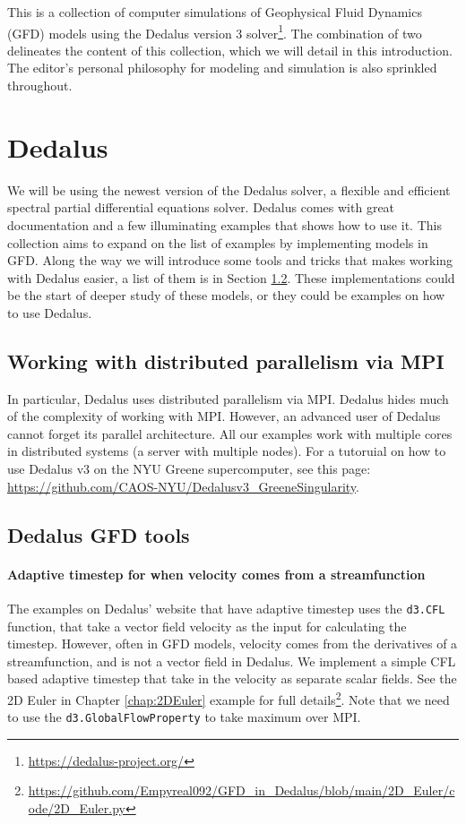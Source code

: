 This is a collection of computer simulations of Geophysical Fluid Dynamics (GFD) models using the Dedalus version 3 solver\footnote{\url{https://dedalus-project.org/}}. The combination of two delineates the content of this collection, which we will detail in this introduction. The editor's personal philosophy for modeling and simulation is also sprinkled throughout. 

\section{Dedalus}
We will be using the newest version of the Dedalus solver, a flexible and efficient spectral partial differential equations solver. Dedalus comes with great documentation and a few illuminating examples that shows how to use it. This collection aims to expand on the list of examples by implementing models in GFD. Along the way we will introduce some tools and tricks that makes working with Dedalus easier, a list of them is in Section \ref{sec:Ded_tools}. These implementations could be the start of deeper study of these models, or they could be examples on how to use Dedalus. 

\subsection{Working with distributed parallelism via MPI}
In particular, Dedalus uses distributed parallelism via MPI. Dedalus hides much of the complexity of working with MPI. However, an advanced user of Dedalus cannot forget its parallel architecture. All our examples work with multiple cores in distributed systems (a server with multiple nodes). For a tutoruial on how to use Dedalus v3 on the NYU Greene supercomputer, see this page: \url{https://github.com/CAOS-NYU/Dedalusv3_GreeneSingularity}.

\subsection{Dedalus GFD tools}\label{sec:Ded_tools}
\paragraph{Adaptive timestep for when velocity comes from a streamfunction}
The examples on Dedalus' website that have adaptive timestep uses the \texttt{d3.CFL} function, that take a vector field velocity as the input for calculating the timestep. However, often in GFD models, velocity comes from the derivatives of a streamfunction, and is not a vector field in Dedalus. We implement a simple CFL based adaptive timestep that take in the velocity as separate scalar fields. See the 2D Euler in Chapter \ref{chap:2DEuler} example for full details\footnote{\url{https://github.com/Empyreal092/GFD_in_Dedalus/blob/main/2D_Euler/code/2D_Euler.py}}. Note that we need to use the \texttt{d3.GlobalFlowProperty} to take maximum over MPI.

